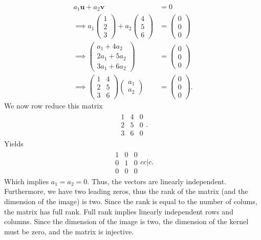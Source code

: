\documentclass{report}
\begin{document}
\begin{itemize}
    \begin{align*}
        a_{1}\mathbf{u} + a_{2}\mathbf{v} &= 0\\
        \implies a_{1}\begin{pmatrix} 1 \\ 2 \\ 3 \end{pmatrix} + a_{2}\begin{pmatrix} 4 \\ 5 \\ 6 \end{pmatrix} &= \begin{pmatrix} 0 \\ 0\\ 0 \end{pmatrix} \\
        \implies \begin{pmatrix} a_{1} + 4a_{2} \\ 2 a_{1} + 5a_{2} \\ 3a_{1} + 6a_{2} \end{pmatrix}  &= \begin{pmatrix} 0 \\ 0\\ 0  \end{pmatrix} \\
        \implies \begin{pmatrix} 1 & 4 \\ 2 & 5 \\ 3 & 6 \end{pmatrix}\begin{pmatrix} a_{1} \\ a_{2} \end{pmatrix} &= \begin{pmatrix} 0 \\ 0 \\ 0 \end{pmatrix}
    .\end{align*}
    We now row reduce this matrix
    \begin{align*}
        \begin{array}{cc|c}
            1 & 4 & 0\\ 2 & 5 & 0\\ 3 & 6 & 0
      \end{array}
    .\end{align*}
    Yields
    \begin{align*}
        \begin{array}{cc|c}
            1 & 0 & 0 \\ 0 & 1 & 0 \\ 0 & 0 & 0 
        \end{array}{cc|c}
    .\end{align*}
    Which implies $a_{1} = a_{2} = 0$. Thus, the vectors are linearly independent. Furthermore, we have two leading zeros, thus the rank of the matrix (and the dimension of the image) is two. Since the rank is equal to the number of colums, the matrix has full rank. Full rank implies linearly independent rows and columns. Since the dimension of the image is two, the dimension of the kernel must be zero, and the matrix is injective.
    \end{itemize}
\end{document}
